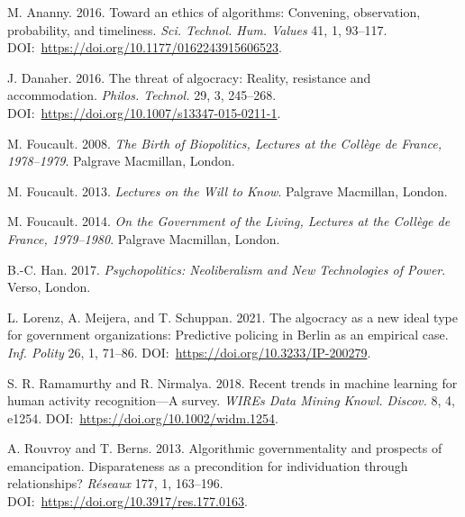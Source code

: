 \begin{thebibliography}{00}
 M. Ananny. 2016. Toward an ethics of algorithms: Convening, observation, probability, and timeliness. \textit{Sci. Technol. Hum. Values} 41, 1, 93--117. DOI:~\href{https://doi.org/10.1177/0162243915606523}{https://{\allowbreak}doi.{\allowbreak}org/{\allowbreak}10.{\allowbreak}1177/{\allowbreak}0162243915606523}.

 J. Danaher. 2016. The threat of algocracy: Reality, resistance and accommodation. \textit{Philos. Technol.} 29, 3, 245--268. DOI:~\href{https://doi.org/10.1007/s13347-015-0211-1}{https://{\allowbreak}doi.{\allowbreak}org/{\allowbreak}10.{\allowbreak}1007/{\allowbreak}s13347-{\allowbreak}015-{\allowbreak}0211-1}.

 M. Foucault. 2008. \textit{The Birth of Biopolitics, Lectures at the Coll\`{e}ge de France, 1978--1979}. Palgrave Macmillan, London.

 M. Foucault. 2013. \textit{Lectures on the Will to Know}. Palgrave Macmillan, London.

 M. Foucault. 2014. \textit{On the Government of the Living, Lectures at the Coll\`{e}ge de France, 1979--1980}. Palgrave Macmillan, London.

 B.-C. Han. 2017. \textit{Psychopolitics: Neoliberalism and New Technologies of Power}. Verso, London.

 L. Lorenz, A. Meijera, and T. Schuppan. 2021. The algocracy as a new ideal type for government organizations: Predictive policing in Berlin as an empirical case. \textit{Inf. Polity} 26, 1, 71--86. DOI:~\href{https://doi.org/10.3233/IP-200279}{https://{\allowbreak}doi.{\allowbreak}org/{\allowbreak}10.{\allowbreak}3233/{\allowbreak}IP-{\allowbreak}200279}.

S. R. Ramamurthy and R. Nirmalya. 2018. Recent trends in machine learning for human activity recognition---A survey. \textit{WIREs Data Mining Knowl. Discov.} 8, 4, e1254. DOI:~\href{https://doi.org/10.1002/widm.1254}{https://{\allowbreak}doi.{\allowbreak}org/{\allowbreak}10.{\allowbreak}1002/{\allowbreak}widm.{\allowbreak}1254}.

 A. Rouvroy and T. Berns. 2013. Algorithmic governmentality and prospects of emancipation. Disparateness as a precondition for individuation through relationships? \textit{R\'{e}seaux} 177, 1, 163--196. DOI:~\href{https://doi.org/10.3917/res.177.0163}{https://{\allowbreak}doi.{\allowbreak}org/{\allowbreak}10.{\allowbreak}3917/{\allowbreak}res.{\allowbreak}177.{\allowbreak}0163}.


\end{thebibliography}
